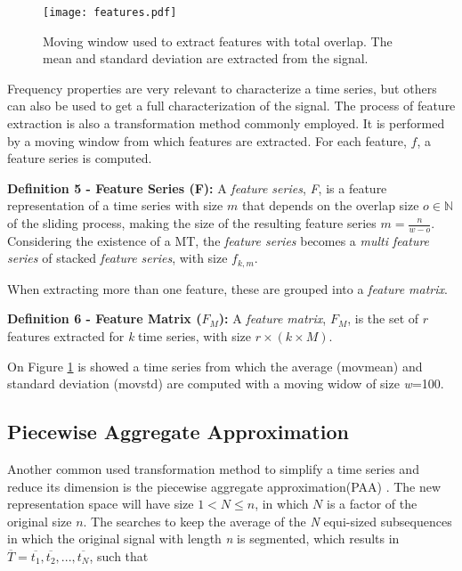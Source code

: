 \begin{figure}[!h]
\centering
\texttt{[image: features.pdf]}
\label{fig:feature_intro}
\caption{Moving window used to extract features with total overlap. The mean and standard deviation are extracted from the signal.}
\end{figure}


Frequency properties are very relevant to characterize a time series, but others can also be used to get a full characterization of the signal. The process of feature extraction is also a transformation method commonly employed. It is performed by a moving window from which features are extracted. For each feature, $f$, a feature series is computed.

\item \textbf{Definition 5 - Feature Series (F):} A \textit{feature series}, \textit{F}, is a feature representation of a time series with size $m$ that depends on the overlap size $o \in \mathbb{N}$ of the sliding process, making the size of the resulting feature series $m = \frac{n}{w-o}$. Considering the existence of a MT, the \textit{feature series} becomes a \textit{multi feature series} of stacked \textit{feature series}, with size $f_{k,m}$.
    
When extracting more than one feature, these are grouped into a \textit{feature matrix}.
    
\item \textbf{Definition 6 - Feature Matrix ($F_M$):} A \textit{feature matrix}, $F_M$, is the set of $r$ features extracted for \textit{k} time series, with size $r \times (k\times M)$.
    
On Figure \ref{fig:feature_intro} is showed a time series from which the average (movmean) and standard deviation (movstd) are computed with a moving widow of size \textit{w}=100.   

\subsection{Piecewise Aggregate Approximation}
\label{subsec:paa}

Another common used transformation method to simplify a time series and reduce its dimension is the piecewise aggregate approximation(PAA) \cite{paa}. The new representation space will have size $1 < N \leq n$, in which $N$ is a factor of the original size $n$. The searches to keep the average of the \textit{N} equi-sized subsequences in which the original signal with length \textit{n} is segmented, which results in $\overline{T} = \overline{t_1}, \overline{t_2}, ...,\overline{t_N}$, such that \cite{paa}

